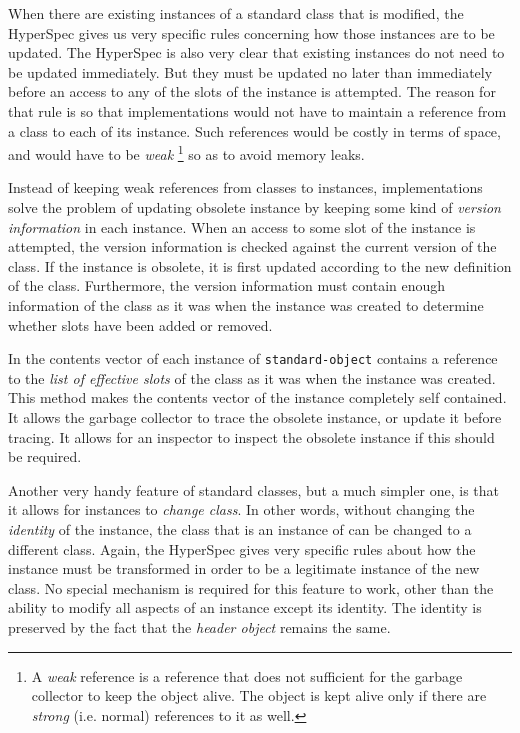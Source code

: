 When there are existing instances of a standard class that is
modified, the HyperSpec gives us very specific rules concerning how
those instances are to be updated.  The HyperSpec is also very clear
that existing instances do not need to be updated immediately.  But
they must be updated no later than immediately before an access to any
of the slots of the instance is attempted.   The reason for that rule
is so that implementations would not have to maintain a reference from
a class to each of its instance.  Such references would be costly in
terms of space, and would have to be \emph{weak}%
\footnote{A \emph{weak} reference is a reference that does not
  sufficient for the garbage collector to keep the object alive.  The
  object is kept alive only if there are \emph{strong} (i.e. normal)
  references to it as well.}
so as to avoid memory leaks. 

Instead of keeping weak references from classes to instances,
implementations solve the problem of updating obsolete instance by
keeping some kind of \emph{version information} in each instance.
When an access to some slot of the instance is attempted, the version
information is checked against the current version of the class.  If
the instance is obsolete, it is first updated according to the new
definition of the class.  Furthermore, the version information must
contain enough information of the class as it was when the instance
was created to determine whether slots have been added or removed. 

In \sysname{} the contents vector of each instance of
\texttt{standard-object} contains a reference to the \emph{list of
  effective slots} of the class as it was when the instance was
created.  This method makes the contents vector of the instance
completely self contained.  It allows the garbage collector to trace
the obsolete instance, or update it before tracing.  It allows for an
inspector to inspect the obsolete instance if this should be
required.  

Another very handy feature of standard classes, but a much simpler
one, is that it allows for instances to \emph{change class}.  In other
words, without changing the \emph{identity} of the instance, the class
that is an instance of can be changed to a different class.  Again,
the HyperSpec gives very specific rules about how the instance must be
transformed in order to be a legitimate instance of the new class.  No
special mechanism is required for this feature to work, other than the
ability to modify all aspects of an instance except its identity.  The
identity is preserved by the fact that the \emph{header object}
remains the same. 

